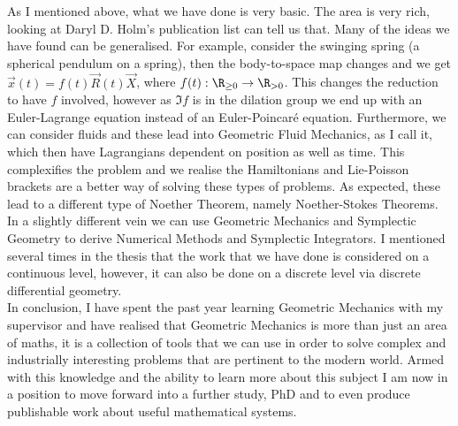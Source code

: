 \noindent
As I mentioned above, what we have done is very basic. The area is very rich, looking at Daryl D. Holm's publication list can tell us that. Many of the ideas we have found can be generalised. For example, consider the swinging spring (a spherical pendulum on a spring), then the body-to-space map changes and we get $\vec x(t) = f(t)\vec R(t)\vec X$, where $f(t) : \R_{\ge 0} \to \R_{> 0}$. This changes the reduction to have $f$ involved, however as $\Im f$ is in the dilation group we end up with an Euler-Lagrange equation instead of an Euler-Poincar\'e equation. Furthermore, we can consider fluids and these lead into Geometric Fluid Mechanics, as I call it, which then have Lagrangians dependent on position as well as time. This complexifies the problem and we realise the Hamiltonians and Lie-Poisson brackets are a better way of solving these types of problems. As expected, these lead to a different type of Noether Theorem, namely Noether-Stokes Theorems. In a slightly different vein we can use Geometric Mechanics and Symplectic Geometry to derive Numerical Methods and Symplectic Integrators. I mentioned several times in the thesis that the work that we have done is considered on a continuous level, however, it can also be done on a discrete level via discrete differential geometry.\\

\noindent
In conclusion, I have spent the past year learning Geometric Mechanics with my supervisor and have realised that Geometric Mechanics is more than just an area of maths, it is a collection of tools that we can use in order to solve complex and industrially interesting problems that are pertinent to the modern world. Armed with this knowledge and the ability to learn more about this subject I am now in a position to move forward into a further study, PhD and to even produce publishable work about useful mathematical systems. 
